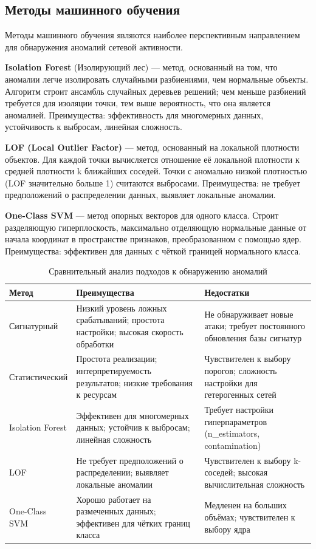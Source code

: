 \subsection{Методы машинного обучения}

Методы машинного обучения являются наиболее перспективным направлением для обнаружения аномалий сетевой активности.

\textbf{Isolation Forest} (Изолирующий лес) — метод, основанный на том, что аномалии легче изолировать случайными разбиениями, чем нормальные объекты. Алгоритм строит ансамбль случайных деревьев решений; чем меньше разбиений требуется для изоляции точки, тем выше вероятность, что она является аномалией. Преимущества: эффективность для многомерных данных, устойчивость к выбросам, линейная сложность.

\textbf{LOF (Local Outlier Factor)} — метод, основанный на локальной плотности объектов. Для каждой точки вычисляется отношение её локальной плотности к средней плотности k ближайших соседей. Точки с аномально низкой плотностью (LOF значительно больше 1) считаются выбросами. Преимущества: не требует предположений о распределении данных, выявляет локальные аномалии.

\textbf{One-Class SVM} — метод опорных векторов для одного класса. Строит разделяющую гиперплоскость, максимально отделяющую нормальные данные от начала координат в пространстве признаков, преобразованном с помощью ядер. Преимущества: эффективен для данных с чёткой границей нормального класса.

\begin{table}[H]
\centering
\caption{Сравнительный анализ подходов к обнаружению аномалий}
\label{tab:comparison}
\begin{tabular}{p{4cm}p{5.5cm}p{5.5cm}}
\toprule
\textbf{Метод} & \textbf{Преимущества} & \textbf{Недостатки} \\
\midrule
Сигнатурный & Низкий уровень ложных срабатываний; простота настройки; высокая скорость обработки & Не обнаруживает новые атаки; требует постоянного обновления базы сигнатур \\
\addlinespace
Статистический & Простота реализации; интерпретируемость результатов; низкие требования к ресурсам & Чувствителен к выбору порогов; сложность настройки для гетерогенных сетей \\
\addlinespace
Isolation Forest & Эффективен для многомерных данных; устойчив к выбросам; линейная сложность & Требует настройки гиперпараметров (n\_estimators, contamination) \\
\addlinespace
LOF & Не требует предположений о распределении; выявляет локальные аномалии & Чувствителен к выбору k-соседей; высокая вычислительная сложность \\
\addlinespace
One-Class SVM & Хорошо работает на размеченных данных; эффективен для чётких границ класса & Медленен на больших объёмах; чувствителен к выбору ядра \\
\bottomrule
\end{tabular}
\end{table}

